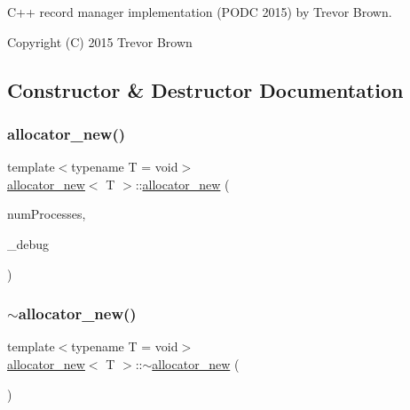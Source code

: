 C++ record manager implementation (P\+O\+DC 2015) by Trevor Brown.

Copyright (C) 2015 Trevor Brown 

\subsection{Constructor \& Destructor Documentation}
\mbox{\label{classallocator__new_a7256b6a2bf88e0ecd0cc437cd3fb6964}} 
\subsubsection{\texorpdfstring{allocator\+\_\+new()}{allocator\_new()}}
{\footnotesize\ttfamily template$<$typename T  = void$>$ \\
\hyperlink{classallocator__new}{allocator\+\_\+new}$<$ T $>$\+::\hyperlink{classallocator__new}{allocator\+\_\+new} (\begin{DoxyParamCaption}\item[{const int}]{num\+Processes,  }\item[{\hyperlink{classdebugInfo}{debug\+Info} $\ast$const}]{\+\_\+debug }\end{DoxyParamCaption})\hspace{0.3cm}{\ttfamily [inline]}}

\mbox{\label{classallocator__new_a608b5c8ce78e0d255e9f26ffc9ef00f8}} 
\subsubsection{\texorpdfstring{$\sim$allocator\+\_\+new()}{~allocator\_new()}}
{\footnotesize\ttfamily template$<$typename T  = void$>$ \\
\hyperlink{classallocator__new}{allocator\+\_\+new}$<$ T $>$\+::$\sim$\hyperlink{classallocator__new}{allocator\+\_\+new} (\begin{DoxyParamCaption}{ }\end{DoxyParamCaption})\hspace{0.3cm}{\ttfamily [inline]}}



